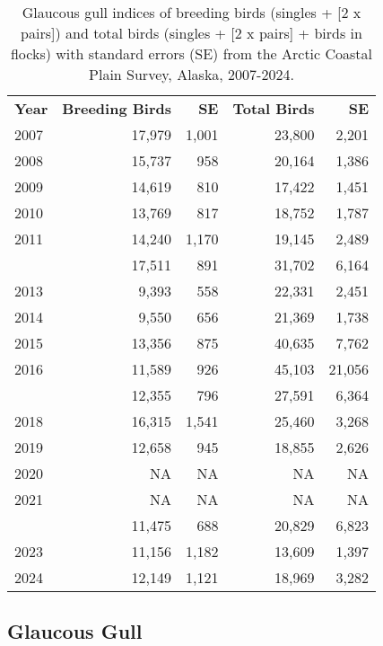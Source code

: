 \documentclass[
]{article}
\begin{document}
\begin{longtable}[t]{lrrrr}

\caption{\label{tbl-GLGU}Glaucous gull indices of breeding birds
(singles + {[}2 x pairs{]}) and total birds (singles + {[}2 x pairs{]} +
birds in flocks) with standard errors (SE) from the Arctic Coastal Plain
Survey, Alaska, 2007-2024.}

\tabularnewline

\\
\toprule
\textbf{Year} & \textbf{Breeding Birds} & \textbf{SE} & \textbf{Total Birds} & \textbf{SE}\\
\midrule
2007 & 17,979 & 1,001 & 23,800 & 2,201\\
2008 & 15,737 & 958 & 20,164 & 1,386\\
2009 & 14,619 & 810 & 17,422 & 1,451\\
2010 & 13,769 & 817 & 18,752 & 1,787\\
2011 & 14,240 & 1,170 & 19,145 & 2,489\\
\addlinespace
2012 & 17,511 & 891 & 31,702 & 6,164\\
2013 & 9,393 & 558 & 22,331 & 2,451\\
2014 & 9,550 & 656 & 21,369 & 1,738\\
2015 & 13,356 & 875 & 40,635 & 7,762\\
2016 & 11,589 & 926 & 45,103 & 21,056\\
\addlinespace
2017 & 12,355 & 796 & 27,591 & 6,364\\
2018 & 16,315 & 1,541 & 25,460 & 3,268\\
2019 & 12,658 & 945 & 18,855 & 2,626\\
2020 & NA & NA & NA & NA\\
2021 & NA & NA & NA & NA\\
\addlinespace
2022 & 11,475 & 688 & 20,829 & 6,823\\
2023 & 11,156 & 1,182 & 13,609 & 1,397\\
2024 & 12,149 & 1,121 & 18,969 & 3,282\\
\bottomrule

\end{longtable}

\endgroup{}

\newpage{}

\subsection*{Glaucous Gull}\label{glaucous-gull-2}
\end{document}
